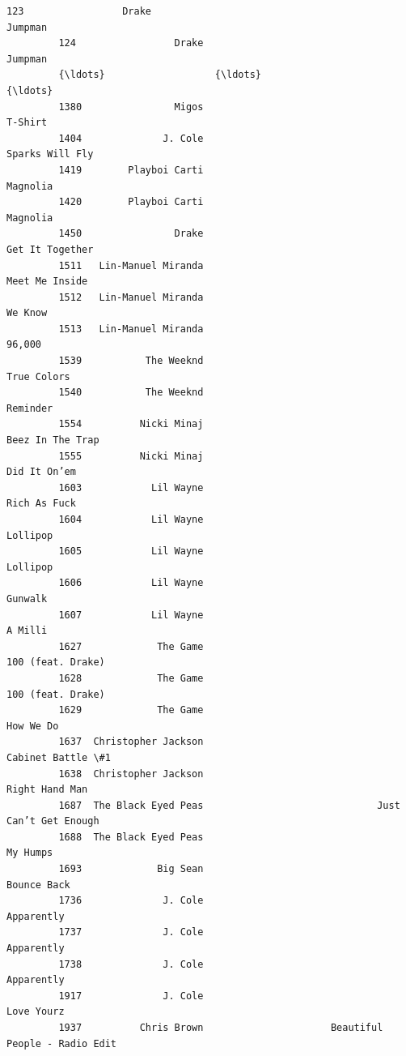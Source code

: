 \documentclass[11pt]{article}
\begin{document}
\begin{Verbatim}[commandchars=\\\{\}]
         123                 Drake                                            Jumpman   
         124                 Drake                                            Jumpman   
         {\ldots}                   {\ldots}                                                {\ldots}   
         1380                Migos                                            T-Shirt   
         1404              J. Cole                                    Sparks Will Fly   
         1419        Playboi Carti                                           Magnolia   
         1420        Playboi Carti                                           Magnolia   
         1450                Drake                                    Get It Together   
         1511   Lin-Manuel Miranda                                     Meet Me Inside   
         1512   Lin-Manuel Miranda                                            We Know   
         1513   Lin-Manuel Miranda                                             96,000   
         1539           The Weeknd                                        True Colors   
         1540           The Weeknd                                           Reminder   
         1554          Nicki Minaj                                   Beez In The Trap   
         1555          Nicki Minaj                                       Did It On’em   
         1603            Lil Wayne                                       Rich As Fuck   
         1604            Lil Wayne                                           Lollipop   
         1605            Lil Wayne                                           Lollipop   
         1606            Lil Wayne                                            Gunwalk   
         1607            Lil Wayne                                            A Milli   
         1627             The Game                                  100 (feat. Drake)   
         1628             The Game                                  100 (feat. Drake)   
         1629             The Game                                          How We Do   
         1637  Christopher Jackson                                  Cabinet Battle \#1   
         1638  Christopher Jackson                                     Right Hand Man   
         1687  The Black Eyed Peas                              Just Can’t Get Enough   
         1688  The Black Eyed Peas                                           My Humps   
         1693             Big Sean                                        Bounce Back   
         1736              J. Cole                                         Apparently   
         1737              J. Cole                                         Apparently   
         1738              J. Cole                                         Apparently   
         1917              J. Cole                                         Love Yourz   
         1937          Chris Brown                      Beautiful People - Radio Edit   
         

\end{Verbatim}
\end{document}
